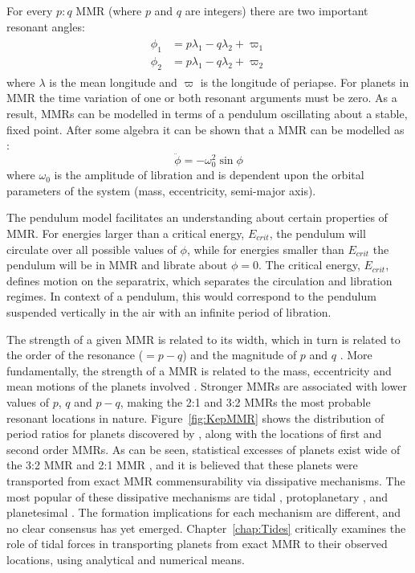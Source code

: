 For every $p:q$ MMR (where $p$ and $q$ are integers) there are two important resonant angles:
\begin{align}
\begin{split}
\phi_1 &= p\lambda_1 - q\lambda_2 + \varpi_1 \\
\phi_2 &= p\lambda_1 - q\lambda_2 + \varpi_2 
\label{eq:MMR}
\end{split}
\end{align}
where $\lambda$ is the mean longitude and $\varpi$ is the longitude of periapse. 
For planets in MMR the time variation of one or both resonant arguments must be zero.
As a result, MMRs can be modelled in terms of a pendulum oscillating about a stable, fixed point. 
After some algebra it can be shown that a MMR can be modelled as \citep{SSD1999}:
\begin{equation}
\ddot{\phi} = -\omega_0^2 \sin\phi
\label{eq:pendulum}
\end{equation}
where $\omega_0$ is the amplitude of libration and is dependent upon the orbital parameters of the system (mass, eccentricity, semi-major axis).

The pendulum model facilitates an understanding about certain properties of MMR. 
For energies larger than a critical energy, $E_{crit}$, the pendulum will circulate over all possible values of $\phi$, while for energies smaller than $E_{crit}$ the pendulum will be in MMR and librate about $\phi = 0$.
The critical energy, $E_{crit}$, defines motion on the separatrix, which separates the circulation and libration regimes. 
In context of a pendulum, this would correspond to the pendulum suspended vertically in the air with an infinite period of libration. 

The strength of a given MMR is related to its width, which in turn is related to the order of the resonance ($= p - q$) and the magnitude of $p$ and $q$ \citep{SSD1999}. 
More fundamentally, the strength of a MMR is related to the mass, eccentricity and mean motions of the planets involved \citep{SSD1999}.
Stronger MMRs are associated with lower values of $p$, $q$ and $p-q$, making the 2:1 and 3:2 MMRs the most probable resonant locations in nature. 
Figure~\ref{fig:KepMMR} shows the distribution of period ratios for planets discovered by \kep, along with the locations of first and second order MMRs. 
As can be seen, statistical excesses of planets exist wide of the 3:2 MMR and 2:1 MMR \citep{Lissauer2011,Fabrycky2014,Steffen2015}, and it is believed that these planets were transported from exact MMR commensurability via dissipative mechanisms.
The most popular of these dissipative mechanisms are tidal \citep{LithwickWu2012, Batygin2013, Delisle2014}, protoplanetary \citep{Rein2012b, Baruteau2013, Goldreich2014}, and planetesimal \citep{Moore2013, Chatterjee2015}.
The formation implications for each mechanism are different, and no clear consensus has yet emerged.
Chapter~\ref{chap:Tides} critically examines the role of tidal forces in transporting \kep planets from exact MMR to their observed locations, using analytical and numerical means. 

